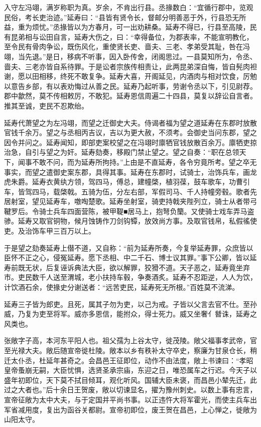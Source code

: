 \documentclass[]{article}
\begin{document}
入守左冯翊，满岁称职为真。岁余，不肯出行县。丞掾数白：``宜循行郡中，览观民俗，考长吏治迹。''延寿曰：``县皆有贤令长，督邮分明善恶于外，行县恐无所益，重为烦忧。''丞掾皆以为方春月，可一出劝耕桑。延寿不得已，行县至高陵，民有昆弟相与讼田自言，延寿大伤之，曰：``幸得备位，为郡表率，不能宣明教化，至令民有骨肉争讼，既伤风化，重使贤长吏、啬夫、三老、孝弟受其耻，咎在冯翊，当先退。''是日，移病不听事，因入卧传舍，闭阁思过。一县莫知所为，令丞、啬夫、三老亦皆自系待罪。于是讼者宗族传相责让，此两昆弟深自悔，皆自髡肉袒谢，愿以田相移，终死不敢复争。延寿大喜，开阁延见，内酒肉与相对饮食，厉勉以意告乡部，有以表劝悔过从善之民。延寿乃起听事，劳谢令丞以下，引见尉荐。郡中歙然，莫不传相敕厉，不敢犯。延寿恩信周遍二十四县，莫复以辞讼自言者。推其至诚，吏民不忍欺绐。

延寿代萧望之为左冯翊，而望之迁御史大夫。侍谒者福为望之道延寿在东郡时放散官钱千余万。望之与丞相丙吉议，吉以为更大赦，不须考。会御史当问东郡，望之因令并问之。延寿闻知，即部吏案校望之在冯翊时廪牺官钱放散百余万。廪牺吏掠治急，自引与望之为奸。延寿劾奏，移殿门禁止望之。望之自奏：``职在总领天下，闻事不敢不问，而为延寿所拘持。''上由是不直延寿，各令穷竟所考。望之卒无事实，而望之遣御史案东郡，具得其事。延寿在东郡时，试骑士，治饰兵车，画龙虎朱爵。延寿衣黄纨方领，驾四马，傅总，建幢棨，植羽葆，鼓车歌车，功曹引车，皆驾四马，载棨戟。五骑为伍，分左右部，军假司马、千人持幢旁毂。歌者先居射室，望见延寿车，噭啕楚歌。延寿坐射室，骑吏持戟夹陛列立，骑士从者带弓鞬罗后。令骑士兵车四面营陈，被甲鞮■居马上，抱弩负籣。又使骑士戏车弄马盗骖。延寿又取官铜物，候月蚀铸作刀剑钩镡，放效尚方事。及取官钱帛，私假徭使吏。及治饰车甲三百万以上。

于是望之劾奏延寿上僣不道，又自称：``前为延寿所奏，今复举延寿罪，众庶皆以臣怀不正之心，侵冤延寿。愿下丞相、中二千石、博士议其罪。''事下公卿，皆以延寿前既无状，后复诬诉典法大臣，欲以解罪，狡猾不道。天子恶之，延寿竟坐弃市。吏民数千人送至渭城，老小扶持车毂，争奏酒炙。延寿不忍距逆，人人为饮，计饮酒石余，使掾史分谢送者：``远苦吏民，延寿死无所根。''百姓莫不流涕。

延寿三子皆为郎吏。且死，属其子勿为吏，以己为戒。子皆以父言去官不仕。至孙威，乃复为吏至将军。威亦多恩信，能拊众，得士死力。威又坐奢亻朁诛，延寿之风类也。

张敞字子高，本河东平阳人也。祖父孺为上谷太守，徙茂陵。敞父福事孝武帝，官至光禄大夫。敞后随宣帝徙杜陵。敞本以乡有秩补太守卒史，察廉为甘泉仓长，稍迁太仆丞，杜延年甚奇之。会昌邑王征即位，动作不由法度，敞上书谏曰：``孝昭皇帝蚤崩无嗣，大臣忧惧，选贤圣承宗庙，东迎之日，唯恐属车之行迟。今天子以盛年初即位，天下莫不拭目倾耳，观化听风。国辅大臣未褒，而昌邑小辇先迁，此过之大者也。''后十余日王贺废，敞以切谏显名，擢为豫州刺史。以数上事有忠言，宣帝征敞为太中大夫，与于定国并平尚书事。以正违忤大将军霍光，而使主兵车出军省减用度，复出为函谷关都尉。宣帝初即位，废王贺在昌邑，上心惮之，徙敞为山阳太守。
\end{document}
